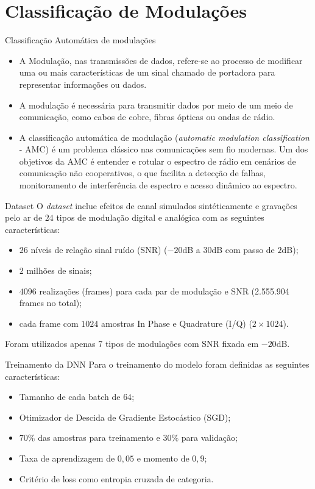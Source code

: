 \section{Classificação de Modulações}

\begin{frame}{Classificação Automática de modulações}
    \begin{itemize}
        \item A Modulação, nas transmissões de dados, refere-se ao processo de modificar uma ou mais características de um sinal chamado de portadora para representar informações ou dados. 
        \item A modulação é necessária para transmitir dados por meio de um meio de comunicação, como cabos de cobre, fibras ópticas ou ondas de rádio.
        \item A classificação automática de modulação (\emph{automatic modulation classification} - AMC) é um problema clássico nas comunicações sem fio modernas. Um dos objetivos da AMC é entender e rotular o espectro de rádio em cenários de comunicação não cooperativos, o que facilita a detecção de falhas, monitoramento de interferência de espectro e acesso dinâmico ao espectro.
    \end{itemize}
\end{frame}

\begin{frame}{Dataset}
    O \emph{dataset} inclue efeitos de canal simulados sintéticamente e gravações pelo ar de $24$ tipos de modulação digital e analógica com as seguintes características:
    \begin{itemize}
        \item $26$ níveis de relação sinal ruído (SNR) ($-20$dB a $30$dB com passo de $2$dB);
        \item $2$ milhões de sinais;
        \item $4096$ realizações (frames) para cada par de modulação e SNR (2.555.904 frames no total);
        \item cada frame com $1024$ amostras In Phase e Quadrature (I/Q) ($2 \times 1024$).
    \end{itemize}
    Foram utilizados apenas 7 tipos de modulações com SNR fixada em $-20$dB.
\end{frame}

\begin{frame}{Treinamento da DNN}
    Para o treinamento do modelo foram definidas as seguintes características:
    \begin{itemize}
        \item Tamanho de cada batch de $64$;
        \item Otimizador de Descida de Gradiente Estocástico (SGD);
        \item $70\%$ das amostras para treinamento e $30\%$ para validação;
        \item Taxa de aprendizagem de $0,05$ e momento de $0,9$;
        \item Critério de loss como entropia cruzada de categoria.
    \end{itemize}
\end{frame}

